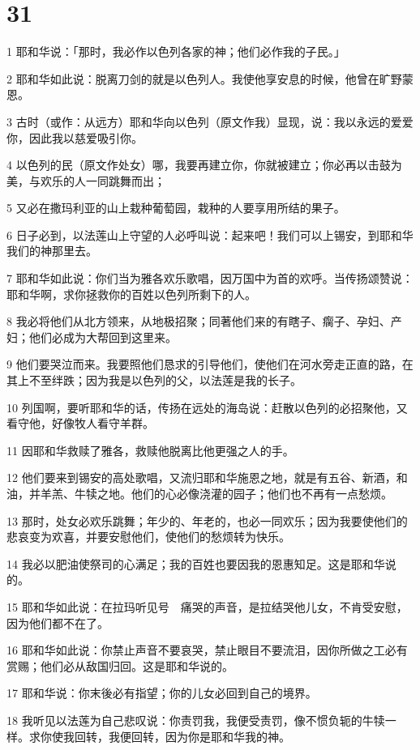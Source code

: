 \chapter{31}

\par 1 耶和华说：「那时，我必作以色列各家的神；他们必作我的子民。」
\par 2 耶和华如此说：脱离刀剑的就是以色列人。我使他享安息的时候，他曾在旷野蒙恩。
\par 3 古时（或作：从远方）耶和华向以色列（原文作我）显现，说：我以永远的爱爱你，因此我以慈爱吸引你。
\par 4 以色列的民（原文作处女）哪，我要再建立你，你就被建立；你必再以击鼓为美，与欢乐的人一同跳舞而出；
\par 5 又必在撒玛利亚的山上栽种葡萄园，栽种的人要享用所结的果子。
\par 6 日子必到，以法莲山上守望的人必呼叫说：起来吧！我们可以上锡安，到耶和华我们的神那里去。
\par 7 耶和华如此说：你们当为雅各欢乐歌唱，因万国中为首的欢呼。当传扬颂赞说：耶和华啊，求你拯救你的百姓以色列所剩下的人。
\par 8 我必将他们从北方领来，从地极招聚；同著他们来的有瞎子、瘸子、孕妇、产妇；他们必成为大帮回到这里来。
\par 9 他们要哭泣而来。我要照他们恳求的引导他们，使他们在河水旁走正直的路，在其上不至绊跌；因为我是以色列的父，以法莲是我的长子。
\par 10 列国啊，要听耶和华的话，传扬在远处的海岛说：赶散以色列的必招聚他，又看守他，好像牧人看守羊群。
\par 11 因耶和华救赎了雅各，救赎他脱离比他更强之人的手。
\par 12 他们要来到锡安的高处歌唱，又流归耶和华施恩之地，就是有五谷、新酒，和油，并羊羔、牛犊之地。他们的心必像浇灌的园子；他们也不再有一点愁烦。
\par 13 那时，处女必欢乐跳舞；年少的、年老的，也必一同欢乐；因为我要使他们的悲哀变为欢喜，并要安慰他们，使他们的愁烦转为快乐。
\par 14 我必以肥油使祭司的心满足；我的百姓也要因我的恩惠知足。这是耶和华说的。
\par 15 耶和华如此说：在拉玛听见号　痛哭的声音，是拉结哭他儿女，不肯受安慰，因为他们都不在了。
\par 16 耶和华如此说：你禁止声音不要哀哭，禁止眼目不要流泪，因你所做之工必有赏赐；他们必从敌国归回。这是耶和华说的。
\par 17 耶和华说：你末後必有指望；你的儿女必回到自己的境界。
\par 18 我听见以法莲为自己悲叹说：你责罚我，我便受责罚，像不惯负轭的牛犊一样。求你使我回转，我便回转，因为你是耶和华我的神。
